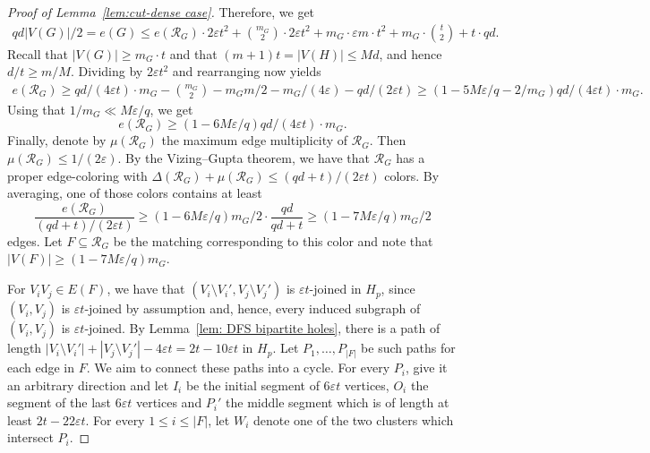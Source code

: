 \documentclass[10pt]{article}
\theoremstyle{definition}
\let\leq\leqslant
\let\geq\geqslant
\begin{document}
\begin{proof}[Proof of Lemma~\ref{lem:cut-dense case}]
Therefore, we get
\begin{align*}
    qd|V(G)|/2=e(G)\leq e(\mathcal{R}_G)\cdot 2\varepsilon t^2+\binom{m_G}{2}\cdot 2\varepsilon t^2+m_G\cdot\varepsilon m\cdot t^2+m_G\cdot \binom{t}{2}+t\cdot qd.
\end{align*}
Recall that $|V(G)|\geq m_G\cdot t$ and that $(m+1)t=|V(H)| \leq Md$, and hence $d/t\geq m/M$. Dividing by $2\varepsilon t^2$ and rearranging now yields
\begin{align*}
    e(\mathcal R_G) \geq qd/(4\varepsilon t)\cdot m_G- \binom{m_G}{2}-m_Gm/2-m_G/(4\varepsilon)-qd/(2\varepsilon t)\geq (1-5M\varepsilon/q-2/m_G)qd/(4\varepsilon t)\cdot m_G. 
\end{align*}
Using that $1/m_G\ll M\varepsilon/q$, we get 
$$
e(\mathcal R_G) \geq (1-6M\varepsilon/q)qd/(4\varepsilon t)\cdot m_G. 
$$
Finally, denote by $\mu(\mathcal R_G)$ the maximum edge multiplicity of $\mathcal R_G$. Then $\mu(\mathcal R_G)\leq 1/(2\varepsilon)$. By the Vizing--Gupta theorem, we have that $\mathcal R_G$ has a proper edge-coloring with $\Delta(\mathcal R_G)+\mu(\mathcal R_G)\leq (qd+t)/(2\varepsilon t)$ colors. By averaging, one of those colors contains at least
$$
\frac{e(\mathcal R_G)}{(qd+t)/(2\varepsilon t)}\geq (1-6 M \varepsilon /q)m_G/2\cdot\frac{qd}{qd+t}\geq (1-7M\varepsilon/q)m_G/2
$$
edges. Let $F\subseteq \mathcal R_G$ be the matching corresponding to this color and note that $|V(F)|\geq (1-7M\varepsilon/q) m_G$.

For $V_iV_j\in E(F)$, we have that $(V_i\setminus V_i',V_j\setminus V_j')$ is $\varepsilon t$-joined in $H_p$, since $(V_i,V_j)$ is $\varepsilon t$-joined by assumption and, hence, every induced subgraph of $(V_i,V_j)$ is $\varepsilon t$-joined. By Lemma~\ref{lem: DFS bipartite holes}, there is a path of length $|V_i\setminus V_i'|+|V_j\setminus V_j'|-4\varepsilon t = 2t-10\varepsilon t$ in $H_p$.  Let $P_1,\ldots,P_{|F|}$ be such paths for each edge in $F$. We aim to connect these paths into a cycle. For every $P_i$, give it an arbitrary direction and let $I_i$ be the initial segment of $6\varepsilon t$ vertices, $O_i$ the segment of the last $6\varepsilon t$ vertices and $P_i'$ the middle segment which is of length at least $2t-22\varepsilon t$. For every $1\leq i\leq |F|$, let $W_i$ denote one of the two clusters which intersect $P_i$.


\end{proof}
\end{document}
